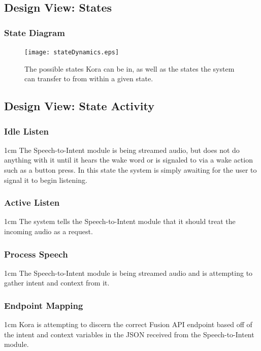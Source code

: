 \documentclass[onecolumn, draftclsnofoot,10pt, compsoc]{IEEEtran}
\newenvironment{indentItem}[1][1cm]{\begin{adjustwidth}{#1}{}}{\end{adjustwidth}}
\begin{document}
	
	\subsection{Design View:  States} 
		\subsubsection{State Diagram}
			\begin{figure}[H]
				\texttt{[image: stateDynamics.eps]}
				\centering
				\caption{The possible states Kora can be in, as well as the states the system can transfer to from within a given state.}
				\label{fig::stateD}
			\end{figure}
	
	\subsection{Design View: State Activity}
		\subsubsection{Idle Listen}
			\begin{indentItem}
				The Speech-to-Intent module is being streamed audio, but does not do anything with it until it hears the wake word or is signaled to via a wake action such as a button press.
				In this state the system is simply awaiting for the user to signal it to begin listening.
			\end{indentItem}
	
	\subsubsection{Active Listen}
		\begin{indentItem}
			The system tells the Speech-to-Intent module that it should treat the incoming audio as a request.
		\end{indentItem}
	
	\subsubsection{Process Speech}
		\begin{indentItem}
			The Speech-to-Intent module is being streamed audio and is attempting to gather intent and context from it.
		\end{indentItem}
	
	\subsubsection{Endpoint Mapping}
		\begin{indentItem}
			Kora is attempting to discern the correct Fusion API endpoint based off of the intent and context variables in the JSON received from the Speech-to-Intent module.
		\end{indentItem}
		
\end{document}
